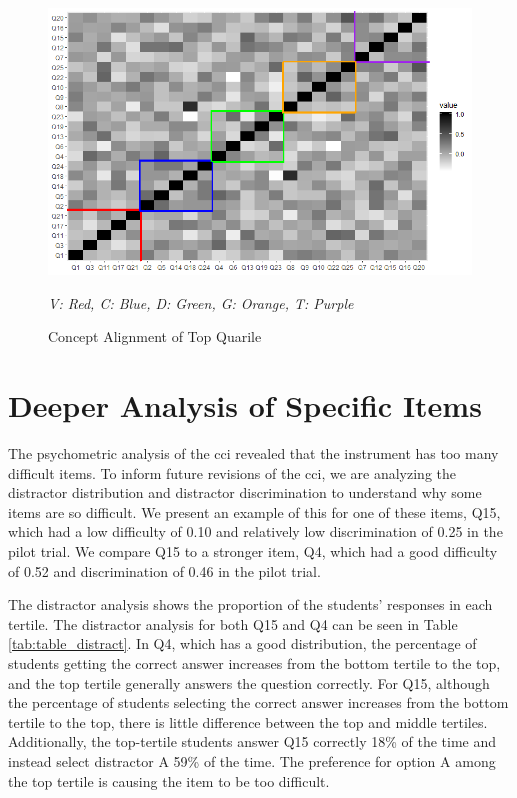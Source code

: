 \begin{figure}[!hbp]
    \centering
    \includegraphics[scale=1.4]{images/heat_map_top_quarter.png}
    \begin{minipage}{0.65\linewidth}
    \tiny
    \emph{
    V: Red,
    C: Blue,
    D: Green,
    G: Orange,
    T: Purple
    }
    \end{minipage}
    \caption{Concept Alignment of Top Quarile}
    \label{fig:alignment}
\end{figure}
\fi

\FloatBarrier
\section{Deeper Analysis of Specific Items}

The psychometric analysis of the \gls{cci} revealed that the instrument has too many difficult items. To inform future revisions of the \gls{cci}, we are analyzing the distractor distribution and distractor discrimination to understand why some items are so difficult. We present an example of this for one of these items, Q15, which had a low difficulty of 0.10 and relatively low discrimination of 0.25 in the pilot trial. We compare Q15 to a stronger item, Q4, which had a good difficulty of 0.52 and discrimination of 0.46 in the pilot trial. 

The distractor analysis shows the proportion of the students' responses in each tertile. The distractor analysis for both Q15 and Q4 can be seen in Table \ref{tab:table_distract}. In Q4, which has a good distribution, the percentage of students getting the correct answer increases from the bottom tertile to the top, and the top tertile generally answers the question correctly. For Q15, although the percentage of students selecting the correct answer increases from the bottom tertile to the top, there is little difference between the top and middle tertiles. Additionally, the top-tertile students answer Q15 correctly 18\% of the time and instead select distractor A 59\% of the time. The preference for option A among the top tertile is causing the item to be too difficult.

